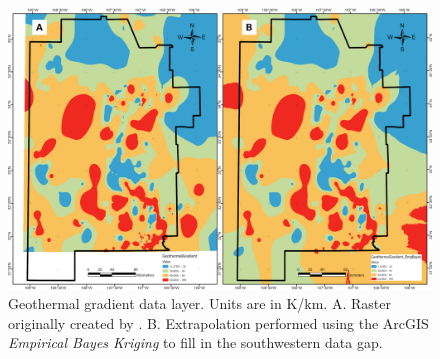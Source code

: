 \begin{figure}[H]
\centering
\includegraphics[width=\linewidth]{templates/images/Figure-PFA_Geothermal_Gradient_sidebyside.png}
\caption[Geothermal gradient data layer]{Geothermal gradient data layer. Units are in K/km. A. Raster originally created by \protect\citet{bielicki_hydrogeolgic_2015}. B. Extrapolation performed using the ArcGIS \textit{Empirical Bayes Kriging} to fill in the southwestern data gap.}
\label{fig:feat_pfa_geotherm_gradient}
\end{figure}

